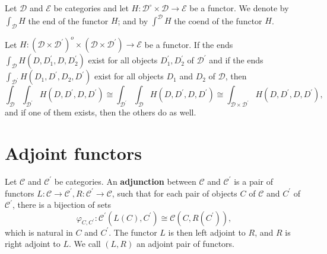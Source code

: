 \begin{example}
Let $\mathcal{D}$ and $\mathcal{E}$ be categories and let $H: \mathcal{D}^{\circ} \times \mathcal{D} \rightarrow \mathcal{E}$ be a functor. We denote by $\int_{\mathcal{D}} H$ the end of the functor $H$; and by $\int^{\mathcal{D}} H$ the coend of the functor $H$.\\

\begin{prop} Let $H:\left(\mathcal{D} \times \mathcal{D}^{\prime}\right)^o \times\left(\mathcal{D} \times \mathcal{D}^{\prime}\right) \rightarrow \mathcal{E}$ be a functor. If the ends $\int_{\mathcal{D}} H\left(D, D_1^{\prime}, D, D_2^{\prime}\right)$ exist for all objects $D_1^{\prime}, D_2^{\prime}$ of $\mathcal{D}^{\prime}$ and if the ends $\int_{\mathcal{D}^{\prime}} H\left(D_1, D^{\prime}, D_2, D^{\prime}\right)$ exist for all objects $D_1$ and $D_2$ of $\mathcal{D}$, then
$$
\int_{\mathcal{D}} \int_{\mathcal{D}^{\prime}} H\left(D, D^{\prime}, D, D^{\prime}\right) \cong \int_{\mathcal{D}^{\prime}} \int_{\mathcal{D}} H\left(D, D^{\prime}, D, D^{\prime}\right) \cong \int_{\mathcal{D} \times \mathcal{D}^{\prime}} H\left(D, D^{\prime}, D, D^{\prime}\right),
$$
and if one of them exists, then the others do as well.
\end{prop} 





\section{Adjoint functors}

Let $\mathcal{C}$ and $\mathcal{C}^{\prime}$ be categories. An \textbf{adjunction} between $\mathcal{C}$ and $\mathcal{C}^{\prime}$ is a pair of functors $L: \mathcal{C} \rightarrow \mathcal{C}^{\prime}, R: \mathcal{C}^{\prime} \rightarrow \mathcal{C}$, such that for each pair of objects $C$ of $\mathcal{C}$ and $C^{\prime}$ of $\mathcal{C}^{\prime}$, there is a bijection of sets
$$
\varphi_{C, C^{\prime}}: \mathcal{C}^{\prime}\left(L(C), C^{\prime}\right) \cong \mathcal{C}\left(C, R\left(C^{\prime}\right)\right),
$$
which is natural in $C$ and $C^{\prime}$.
The functor $L$ is then left adjoint to $R$, and $R$ is right adjoint to $L$. We call $(L, R)$ an adjoint pair of functors.


\end{example}
